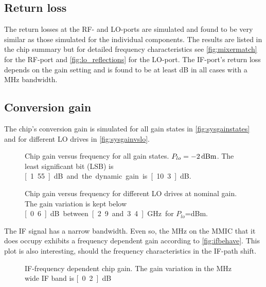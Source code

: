 		\subsection{Return loss}
			The return losses at the RF- and LO-ports are simulated and found to be very similar as those simulated for the individual components. The results are listed in the chip summary but for detailed frequency characteristics see \autoref{fig:mixermatch} for the RF-port and \autoref{fig:lo_reflections} for the LO-port. The IF-port's return loss depends on the gain setting and is found to be at least \unit[21]{dB} in all cases with a \unit[100]{MHz} bandwidth.
			
		\subsection{Conversion gain}
			The chip's conversion gain is simulated for all gain states in \autoref{fig:sysgainstates} and for different LO drives in \autoref{fig:sysgainvslo}.
			
			\begin{figure}[hbt!]
				\centering
				\caption[Chip gain for all gain states.]{Chip gain versus frequency for all gain states. $P_{lo}=\unit[-2]{dBm}$. The least significant bit (LSB) is \unit[1.55]{dB} and the dynamic gain is \unit[10.3]{dB}.}\label{fig:sysgainstates}
			\end{figure}
			
			\begin{figure}[hbt!]
				\centering
				\caption[Chip gain for different LO drives.]{Chip gain versus frequency for different LO drives at nominal gain. The gain variation is kept below \unit[0.6]{dB} between \unit[2.9 and 3.4]{GHz} for $P_{lo}$=\unit[-4 to 0]{dBm}.}\label{fig:sysgainvslo}
			\end{figure}
			
			The IF signal has a narrow bandwidth. Even so, the \unit[20]{MHz} on the MMIC that it does occupy exhibits a frequency dependent gain according to \autoref{fig:ifbehave}. This plot is also interesting, should the frequency characteristics in the IF-path shift.
			
			\begin{figure}[hbt!]
				\centering
				\caption[IF-frequency dependent chip gain.]{IF-frequency dependent chip gain. The gain variation in the \unit[20]{MHz} wide IF band is \unit[0.2]{dB}}\label{fig:ifbehave}
			\end{figure}
			
